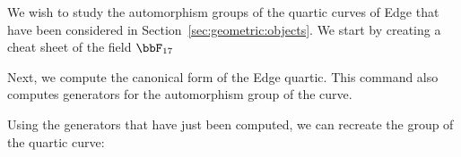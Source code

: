 
We wish to study the automorphism groups of the quartic curves 
of Edge that have been considered in Section~\ref{sec:geometric:objects}.
We start by creating a cheat sheet of the field $\bbF_{17}$


Next, we compute the canonical form of the Edge quartic. 
This command also computes generators for the automorphism group of the curve.


Using the generators that have just been computed, 
we can recreate the group of the quartic curve:


